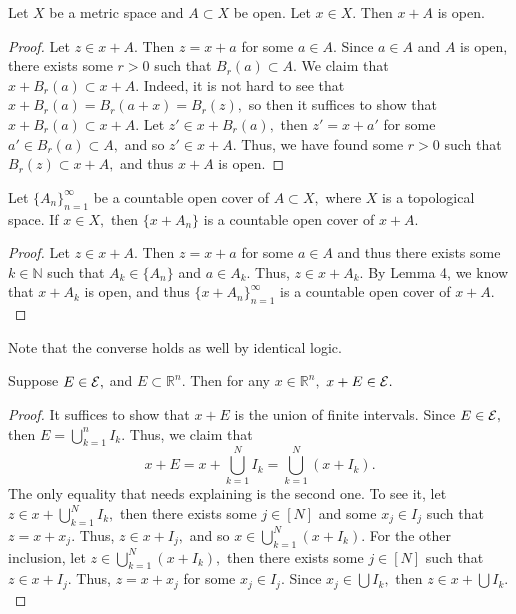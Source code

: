 \documentclass[11pt]{article}
\newcommand{\bbN}{\mathbb{N}}
\newcommand{\bbR}{\mathbb{R}}
\begin{document}
\begin{solution}
    \begin{lemma}
    Let $X$ be a metric space and $A \subset X$ be open. Let $x\in X.$ Then $x + A$ is open.
    \end{lemma}
    \begin{proof}
        Let $z \in x + A.$ Then $z = x + a$ for some $a \in A.$ Since $a \in A$ and $A$ is open, there exists some $r>0$ such that $B_r(a)\subset A.$ We claim that $x + B_r(a) \subset x + A.$ Indeed, it is not hard to see that $x + B_r(a) = B_r(a + x) = B_r(z),$ so then it suffices to show that $x + B_r(a) \subset x + A.$ Let $z' \in x + B_r(a),$ then $z' = x + a'$ for some $a' \in B_r(a) \subset A,$ and so $z' \in x + A.$ Thus, we have found some $r>0$ such that $B_r(z)\subset x + A,$ and thus $x + A$ is open.
    \end{proof}
    \begin{lemma}
        Let $\{A_n\}_{n =1}^\infty$ be a countable open cover of $A \subset X,$ where $X$ is a topological space. If $x \in X,$ then $\{x + A_n\}$ is a countable open cover of $x + A.$
    \end{lemma}
    \begin{proof}
        Let $z \in x + A.$ Then $z = x + a$ for some $a\in A$ and thus there exists some $k \in \bbN$ such that $A_k \in \{A_n\}$ and $a \in A_k.$ Thus, $z\in x + A_k.$ By Lemma 4, we know that $x + A_k$ is open, and thus $\{x + A_n\}_{n =1}^\infty$ is a countable open cover of $x + A.$
    \end{proof}
    Note that the converse holds as well by identical logic.
    \begin{lemma}
     Suppose $E \in \cal E,$ and $E \subset \bbR^n.$ Then for any $x\in \bbR^n,$ $x + E \in \cal E.$
    \end{lemma}
    \begin{proof}
        It suffices to show that $x + E$ is the union of finite intervals. Since $E \in \cal E,$ then $E = \bigcup_{k=1}^n I_k.$ Thus, we claim that
        \[x + E = x + \bigcup_{k=1}^N I_k = \bigcup_{k=1}^N(x + I_k).\] The only equality that needs explaining is the second one. To see it, let $z \in x + \bigcup_{k=1}^N I_k,$ then there exists some $j \in [N]$ and some $x_j \in I_j$ such that $z = x + x_j.$ Thus, $z \in x + I_j,$ and so $x \in \bigcup_{k=1}^N (x + I_k).$ For the other inclusion, let $z\in \bigcup_{k=1}^N (x + I_k),$ then there exists some $j \in [N]$ such that $z\in x + I_j.$ Thus, $z = x + x_j$ for some $x_j \in I_j.$ Since $x_j \in \bigcup I_k,$ then $z \in x + \bigcup I_k.$
        

\end{proof}
\end{solution}
\end{document}
